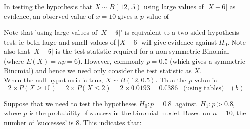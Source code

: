 \documentclass[bigtut]{tutorial}
\begin{document}
\begin{tutorial}
\begin{questions}
\question 
In testing the hypothesis that $X\sim B(12,.5)$ using large values of $|X-6|$ as
evidence, an observed value of $x=10$ gives a  $p$-value of

\begin{solution}
Note that 'using large values of $|X-6|$' is equivalent to a two-sided hypothesis test: ie both large and small values of 
$|X-6|$ will give evidence against $H_0$. Note also that $|X-6|$ is the test statistic required for a non-symmetric Binomial (where $E(X) = np = 6$). However, commonly $p=0.5$ (which gives a symmetric Binomial) and hence we need only consider the test statistic as $X$.  \\

When the null hypothesis is true, $X\sim B(12,0.5)$. Thus the $p$-value is
\[  2 \times P(X\geq 10) = 2 \times P(X\leq 2)  = 2 \times 0.0193 =  0.0386   \;\;\; \text{(using tables)} \;\;\;  (b)\]
\end{solution}


\question 
Suppose that we need to test the hypotheses $H_0 : p = 0.8
 \;\; \mbox{against} \;\;  H_1 : p > 0.8$, where $p$ is the probability of success in the binomial model. Based on $n =10$, the number of 'successes' is 8.   This
indicates that:
\end{questions}
\end{tutorial}
\end{document}
